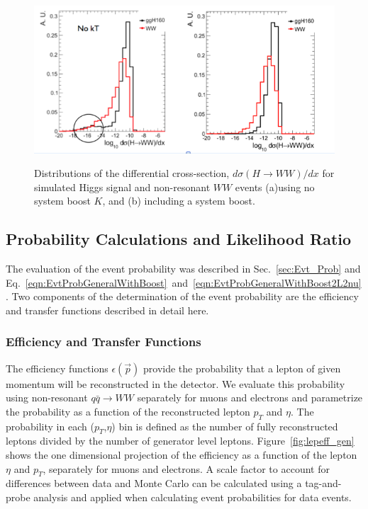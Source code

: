 \begin{figure}[!hbtp]                                                                                         
\centering                                                                                                                                             
\includegraphics[width=.84\textwidth]{figures/SystemBoostEffect.png}\\                                            
\caption{
Distributions of the differential cross-section, $d\sigma(H \rightarrow WW)/dx$ for simulated Higgs signal and non-resonant $WW$ events
(a)using no system boost $K$, and (b) including a system boost.}
\label{fig:kteffect}                                                                                          
\end{figure}          

\subsection{Probability Calculations and Likelihood Ratio}
\label{sec:Probability}
The evaluation of the event probability was described in Sec.~\ref{sec:Evt_Prob} and 
Eq.~\ref{eqn:EvtProbGeneralWithBoost}~and~\ref{eqn:EvtProbGeneralWithBoost2L2nu}.
Two components of the determination of the event probability are the efficiency
and transfer functions described in detail here.

\subsubsection{Efficiency and Transfer Functions}
\label{sec:EfficiencyTransfer}
The efficiency functions $\epsilon(\vec{p})$ provide the probability that a lepton of given momentum
will be reconstructed in the detector. We evaluate this probability using non-resonant $q\bar{q}\rightarrow WW$
separately for muons and electrons and parametrize the probability as a function of the reconstructed
lepton $p_{T}$ and $\eta$.
The probability in each ($p_{T}$,$\eta$) bin is defined as the number of fully reconstructed leptons divided 
by the number of generator level leptons. Figure~\ref{fig:lepeff_gen} shows the 
one dimensional projection of the efficiency as a function of the lepton $\eta$ and $p_{T}$, separately for
muons and electrons. 
A scale factor to account for differences between 
data and Monte Carlo can be calculated using a tag-and-probe analysis and applied when calculating event 
probabilities for data events.

